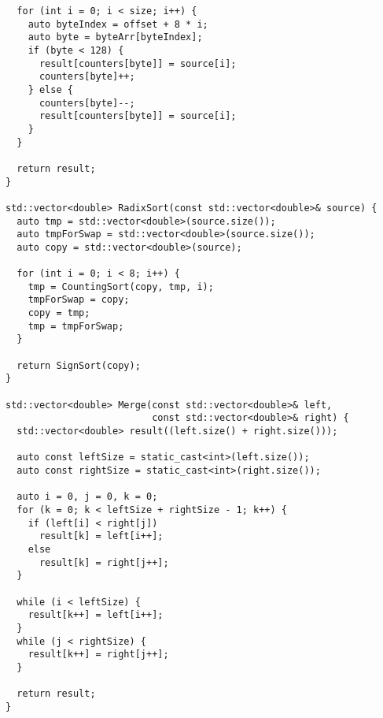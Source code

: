 \documentclass{report}
\begin{document}
\begin{lstlisting}
  for (int i = 0; i < size; i++) {
    auto byteIndex = offset + 8 * i;
    auto byte = byteArr[byteIndex];
    if (byte < 128) {
      result[counters[byte]] = source[i];
      counters[byte]++;
    } else {
      counters[byte]--;
      result[counters[byte]] = source[i];
    }
  }

  return result;
}

std::vector<double> RadixSort(const std::vector<double>& source) {
  auto tmp = std::vector<double>(source.size());
  auto tmpForSwap = std::vector<double>(source.size());
  auto copy = std::vector<double>(source);

  for (int i = 0; i < 8; i++) {
    tmp = CountingSort(copy, tmp, i);
    tmpForSwap = copy;
    copy = tmp;
    tmp = tmpForSwap;
  }

  return SignSort(copy);
}

std::vector<double> Merge(const std::vector<double>& left,
                          const std::vector<double>& right) {
  std::vector<double> result((left.size() + right.size()));

  auto const leftSize = static_cast<int>(left.size());
  auto const rightSize = static_cast<int>(right.size());

  auto i = 0, j = 0, k = 0;
  for (k = 0; k < leftSize + rightSize - 1; k++) {
    if (left[i] < right[j])
      result[k] = left[i++];
    else
      result[k] = right[j++];
  }

  while (i < leftSize) {
    result[k++] = left[i++];
  }
  while (j < rightSize) {
    result[k++] = right[j++];
  }

  return result;
}

    \end{lstlisting}
\end{document}

